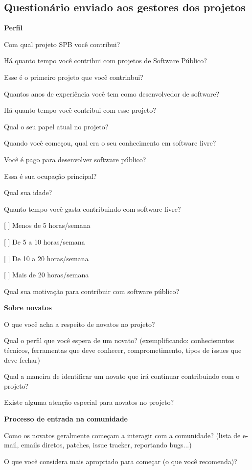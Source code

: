 \begin{anexosenv}
\chapter{Questionário enviado aos gestores dos projetos}
\label{anexo e}

\textbf{Perfil}

Com qual projeto SPB você contribui?

Há quanto tempo você contribui com projetos de Software Público?

Esse é o primeiro projeto que você contrinbui?

Quantos anos de experiência você tem como desenvolvedor de software?

Há quanto tempo você contribui com esse projeto?

Qual o seu papel atual no projeto?

Quando você começou, qual era o seu conhecimento em software livre?

Você é pago para desenvolver software público?

Essa é sua ocupação principal?

Qual sua idade?

Quanto tempo você gasta contribuindo com software livre?

[ ] Menos de 5 horas/semana 

[ ] De 5 a 10 horas/semana

[ ] De 10 a 20 horas/semana

[ ] Mais de 20 horas/semana

Qual sua motivação para contribuir com software público?

\textbf{Sobre novatos}

O que você acha a respeito de novatos no projeto?

Qual o perfil que você espera de um novato? (exemplificando: conheciemntos técnicos, 
ferramentas que deve conhecer, comprometimento, tipos de issues que deve fechar)

Qual a maneira de identificar um novato que irá continuar contribuindo com o projeto?

Existe alguma atenção especial para novatos no projeto?

\textbf{Processo de entrada na comunidade}

Como os novatos geralmente começam a interagir com a comunidade? (lista de e-mail, 
emails diretos, patches, issue tracker, reportando bugs...)

O que você considera mais apropriado para começar (o que você recomenda)?


\end{anexosenv}
